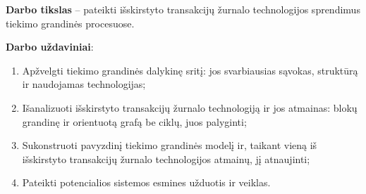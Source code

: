 \textbf{Darbo tikslas} – pateikti išskirstyto transakcijų žurnalo technologijos sprendimus tiekimo grandinės procesuose. 

\textbf{Darbo uždaviniai}:
\begin{enumerate}
    \item Apžvelgti tiekimo grandinės dalykinę sritį: jos svarbiausias sąvokas, struktūrą ir naudojamas technologijas;
    \item Išanalizuoti išskirstyto transakcijų žurnalo technologiją ir jos atmainas: blokų grandinę ir orientuotą grafą be ciklų, juos palyginti;
    \item Sukonstruoti pavyzdinį tiekimo grandinės modelį ir, taikant vieną iš išskirstyto transakcijų žurnalo technologijos atmainų, jį atnaujinti;
    \item Pateikti potencialios sistemos esmines užduotis ir veiklas.
\end{enumerate}